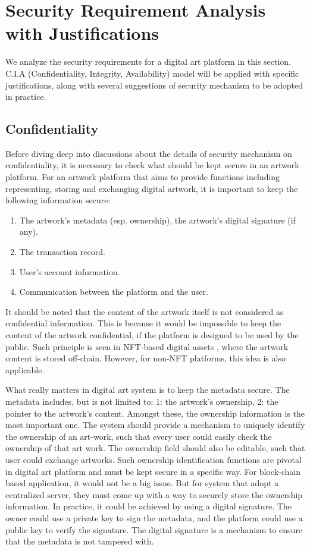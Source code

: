 \section{Security Requirement Analysis with Justifications}
We analyze the security requirements for a digital art platform in this section. C.I.A (Confidentiality, Integrity, Availability) model will be applied with specific justifications, along with several suggestions of security mechanism to be adopted in practice.

\subsection{Confidentiality}\label{sec:confiden}

Before diving deep into discussions about the details of security mechanism on confidentiality, it is necessary to check what should be kept secure in an artwork platform. For an artwork platform that aims to provide functions including representing, storing and exchanging digital artwork, it is important to keep the following information secure:

\begin{enumerate}
\item The artwork's metadata (esp. ownership), the artwork's digital signature (if any).
\item The transaction record.
\item User's account information.
\item Communication between the platform and the user.
\end{enumerate}

It should be noted that the content of the artwork itself is not considered as confidential information. This is because it would be impossible to keep the content of the artwork confidential, if the platform is designed to be used by the public. Such principle is seen in NFT-based digital assets \citep{daniele_2021}, where the artwork content is stored off-chain. However, for non-NFT platforms, this idea is also applicable.


What really matters in digital art system is to keep the metadata secure. The metadata includes, but is not limited to: 1: the artwork's ownership, 2: the pointer to the artwork's content. Amongst these, the ownership information is the most important one. The system should provide a mechanism to uniquely identify the ownership of an art-work, such that every user could easily check the ownership of that art work. The ownership field should also be editable, such that user could exchange artworks. Such ownership identification functions are pivotal in digital art platform and must be kept secure in a specific way. For block-chain based application, it would not be a big issue. But for system that adopt a centralized server, they must come up with a way to securely store the ownership information. In practice, it could be achieved by using a digital signature. The owner could use a private key to sign the metadata, and the platform could use a public key to verify the signature. The digital signature is a mechanism to ensure that the metadata is not tampered with.

